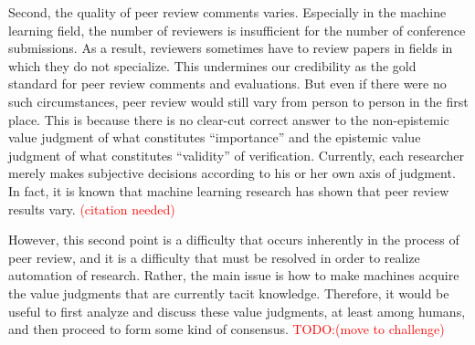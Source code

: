 Second, the quality of peer review comments varies. Especially in the machine learning field, the number of reviewers is insufficient for the number of conference submissions. As a result, reviewers sometimes have to review papers in fields in which they do not specialize. This undermines our credibility as the gold standard for peer review comments and evaluations. But even if there were no such circumstances, peer review would still vary from person to person in the first place. This is because there is no clear-cut correct answer to the non-epistemic value judgment of what constitutes ``importance'' and the epistemic value judgment of what constitutes ``validity'' of verification. Currently, each researcher merely makes subjective decisions according to his or her own axis of judgment. In fact, it is known that machine learning research has shown that peer review results vary.
\textcolor{red}{(citation needed)}

However, this second point is a difficulty that occurs inherently in the process of peer review, and it is a difficulty that must be resolved in order to realize automation of research. Rather, the main issue is how to make machines acquire the value judgments that are currently tacit knowledge. Therefore, it would be useful to first analyze and discuss these value judgments, at least among humans, and then proceed to form some kind of consensus.
\textcolor{red}{TODO:(move to challenge)}